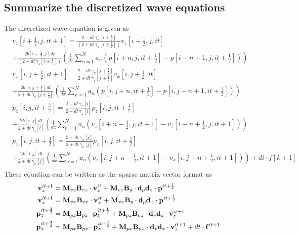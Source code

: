 \documentclass[revised,endfloat]{geophysics}
\begin{document}
\subsection{Summarize the discretized wave equations}
The discretized wave-equation is given as
\begin{equation}
\begin{split}
& v_z[i+\frac{1}{2},j,it+1] =  \frac{2- dt\, \gamma_z[i+\frac{1}{2}]}{(2+ dt\, \gamma_z[i+\frac{1}{2}])}v_z[i+\frac{1}{2},j,it] \\
&+ \frac{2b[i+\frac{1}{2},j] \, dt}{(2+ dt\, \gamma_z[i+\frac{1}{2}])} \left(\frac{1}{dz} \sum_{n=1}^N  a_n \left( p[i+n,j,it+\frac{1}{2}] - p[i-n+1,j,it+\frac{1}{2}] \right)  \right) \\
& v_x[i,j+\frac{1}{2},it+1] =  \frac{2- dt\, \gamma_x[j+\frac{1}{2}]}{2+ dt\, \gamma_x[j+\frac{1}{2}]}v_x[i,j+\frac{1}{2},it] \\
& + \frac{2b[i,j+\frac{1}{2}] \, dt}{2+ dt\, \gamma_x[j+\frac{1}{2}]}
\left( \frac{1}{dx} \sum_{n=1}^N  a_n \left( p[i,j+n,it+\frac{1}{2}] - p[i,j-n+1,it+\frac{1}{2}]\right) \right) \\
& p_z[i,j,it+\frac{3}{2}] = \frac{2-dt \, \gamma_z[i]}{2+dt \, \gamma_z[i]} p_z[i,j,it+\frac{1}{2}]  \\
& + \frac{2k[i,j] \, dt}{2+dt \, \gamma_z[i] } \left(\frac{1}{dz} \sum_{n=1}^N  a_n \left( v_z[i+n-\frac{1}{2},j,it+1] - v_z[i-n+\frac{1}{2},j,it+1] \right)  \right) \\
&p_x[i,j,it+\frac{3}{2}] = \frac{2-dt \, \gamma_x[j]}{2+dt \, \gamma_x[j]} p_x[i,j,it+\frac{1}{2}]  \\
&+ \frac{2k[i,j]\, dt}{2+dt \, \gamma_x[j]} \left(\frac{1}{dx} \sum_{n=1}^N  a_n \left(v_x[i,j+n-\frac{1}{2},it+1] - v_x[i,j-n+\frac{1}{2},it+1] \right) \right) + dt \cdot f[k+1]  \\
\end{split}
\label{eq39}
\end{equation}
These equation can be written as the sparse matrix-vector format as
\begin{equation}
\begin{split}
{\bf v}_z^{it+1} &= {\bf M}_{vz}{\bf B}_{vz}  \cdot {\bf v}_z^{it} +  {\bf M}_{vz}{\bf B}_{p} \cdot {\bf d}_p{\bf d}_z \cdot {\bf p}^{it+\frac{1}{2}} \\
{\bf v}_x^{it+1} &=  {\bf M}_{vx}{\bf B}_{vx} \cdot {\bf v}_x^{it} +  {\bf M}_{vx}{\bf B}_{p} \cdot {\bf d}_p{\bf d}_x \cdot {\bf p}^{it+\frac{1}{2}}  \\
{\bf p}_z^{it+\frac{3}{2}} &= {\bf M}_{pz}{\bf B}_{pz}  \cdot {\bf p}_z^{it+\frac{1}{2}} +  {\bf M}_{pz}{\bf B}_{vz} \cdot {\bf d}_v{\bf d}_z \cdot {\bf v}_z^{it+1}  \\
{\bf p}_x^{it+\frac{3}{2}} &=  {\bf M}_{px}{\bf B}_{px} \cdot {\bf p}_x^{it+\frac{1}{2}} +  {\bf M}_{px}{\bf B}_{vx} \cdot {\bf d}_v{\bf d}_x \cdot {\bf v}_x^{it+1} + dt \cdot {\bf f}^{it+1}  \\
\end{split}
\label{eq40}
\end{equation}
\end{document}
